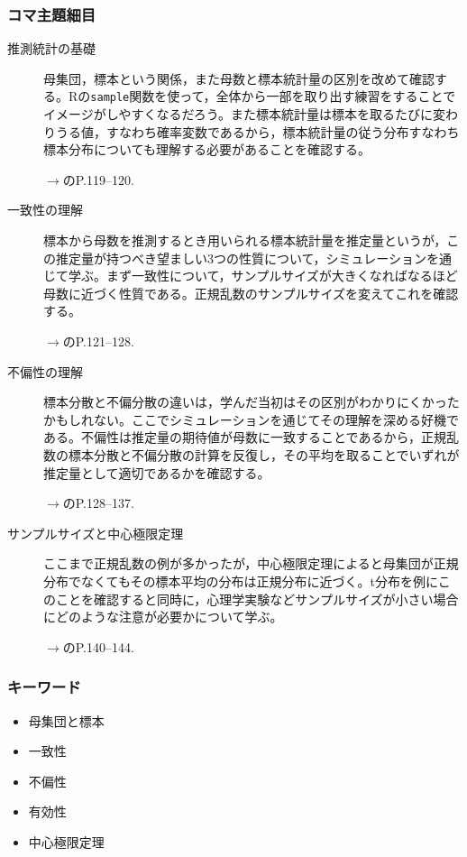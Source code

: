 \subsubsection{コマ主題細目}
\begin{description}
	\item[推測統計の基礎] 母集団，標本という関係，また母数と標本統計量の区別を改めて確認する。Rの\verb|sample|関数を使って，全体から一部を取り出す練習をすることでイメージがしやすくなるだろう。また標本統計量は標本を取るたびに変わりうる値，すなわち確率変数であるから，標本統計量の従う分布すなわち標本分布についても理解する必要があることを確認する。
		\begin{flushright}
			$\to$\textcite{kosugi2023}のP.119--120.
		\end{flushright}
	\item[一致性の理解] 標本から母数を推測するとき用いられる標本統計量を推定量というが，この推定量が持つべき望ましい3つの性質について，シミュレーションを通じて学ぶ。まず一致性について，サンプルサイズが大きくなればなるほど母数に近づく性質である。正規乱数のサンプルサイズを変えてこれを確認する。
		\begin{flushright}
			$\to$\textcite{kosugi2023}のP.121--128.
		\end{flushright}
	\item[不偏性の理解] 標本分散と不偏分散の違いは，学んだ当初はその区別がわかりにくかったかもしれない。ここでシミュレーションを通じてその理解を深める好機である。不偏性は推定量の期待値が母数に一致することであるから，正規乱数の標本分散と不偏分散の計算を反復し，その平均を取ることでいずれが推定量として適切であるかを確認する。
		\begin{flushright}
			$\to$\textcite{kosugi2023}のP.128--137.
		\end{flushright}
	\item[サンプルサイズと中心極限定理] ここまで正規乱数の例が多かったが，中心極限定理によると母集団が正規分布でなくてもその標本平均の分布は正規分布に近づく。t分布を例にこのことを確認すると同時に，心理学実験などサンプルサイズが小さい場合にどのような注意が必要かについて学ぶ。
		\begin{flushright}
			$\to$\textcite{kosugi2023}のP.140--144.
		\end{flushright}
\end{description}

\subsubsection{キーワード}
\begin{itemize}
	\item 母集団と標本
	\item 一致性
	\item 不偏性
	\item 有効性
	\item 中心極限定理
\end{itemize}

